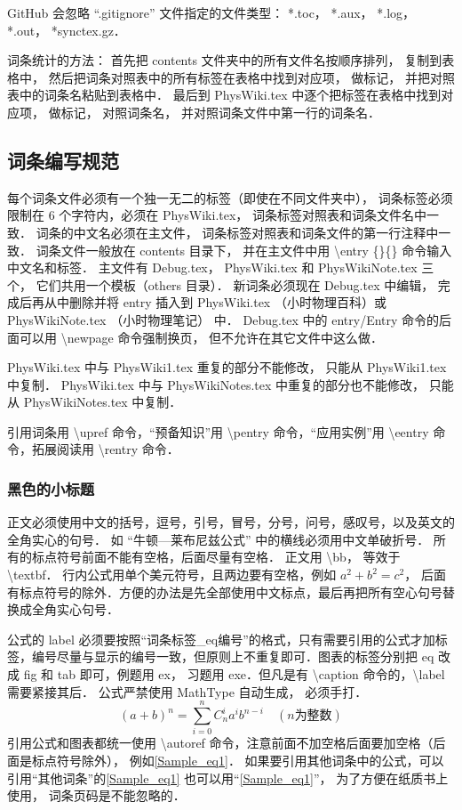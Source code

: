 GitHub 会忽略 “.gitignore” 文件指定的文件类型： *.toc， *.aux， *.log， *.out， *synctex.gz．

词条统计的方法： 首先把 contents 文件夹中的所有文件名按顺序排列， 复制到表格中， 然后把词条对照表中的所有标签在表格中找到对应项， 做标记， 并把对照表中的词条名粘贴到表格中． 最后到 PhysWiki.tex 中逐个把标签在表格中找到对应项， 做标记， 对照词条名， 并对照词条文件中第一行的词条名．

\subsection{词条编写规范}

每个词条文件必须有一个独一无二的标签（即使在不同文件夹中）， 词条标签必须限制在 6 个字符内，必须在 PhysWiki.tex， 词条标签对照表和词条文件名中一致． 词条的中文名必须在主文件， 词条标签对照表和词条文件的第一行注释中一致． 词条文件一般放在 contents 目录下， 并在主文件中用 \textbackslash entry \{\}\{\} 命令输入中文名和标签． 主文件有 Debug.tex， PhysWiki.tex 和 PhysWikiNote.tex 三个， 它们共用一个模板（others 目录）． 新词条必须现在 Debug.tex 中编辑， 完成后再从中删除并将 entry 插入到 PhysWiki.tex （小时物理百科）或 PhysWikiNote.tex （小时物理笔记） 中． Debug.tex 中的 entry/Entry 命令的后面可以用 \textbackslash newpage 命令强制换页， 但不允许在其它文件中这么做．

PhysWiki.tex 中与 PhysWiki1.tex 重复的部分不能修改， 只能从 PhysWiki1.tex 中复制． PhysWiki.tex 中与 PhysWikiNotes.tex 中重复的部分也不能修改， 只能从 PhysWikiNotes.tex 中复制．

引用词条用 \textbackslash upref 命令，“预备知识”用 \textbackslash pentry 命令，“应用实例”用 \textbackslash eentry 命令，拓展阅读用 \textbackslash rentry 命令．

\subsubsection{黑色的小标题}

正文必须使用中文的括号，逗号，引号，冒号，分号，问号，感叹号，以及英文的全角实心的句号． 如 “牛顿—莱布尼兹公式” 中的横线必须用中文单破折号． 所有的标点符号前面不能有空格，后面尽量有空格． 正文用 \textbackslash bb， 等效于 \textbackslash textbf． 行内公式用单个美元符号，且两边要有空格，例如 $a^2+b^2=c^2$， 后面有标点符号的除外．方便的办法是先全部使用中文标点，最后再把所有空心句号替换成全角实心句号．

公式的 label 必须要按照“词条标签\_eq编号”的格式，只有需要引用的公式才加标签，编号尽量与显示的编号一致，但原则上不重复即可．图表的标签分别把 eq 改成 fig 和 tab 即可，例题用 ex， 习题用 exe．但凡是有 \textbackslash caption 命令的，\textbackslash label 需要紧接其后． 公式严禁使用 MathType 自动生成， 必须手打．
\begin{equation}\label{Sample_eq1}
(a+b)^n = \sum_{i=0}^n C_n^i a^i b^{n-i} \quad (n\text{为整数})
\end{equation}
引用公式和图表都统一使用 \textbackslash autoref 命令，注意前面不加空格后面要加空格（后面是标点符号除外）， 例如\autoref{Sample_eq1}． 如果要引用其他词条中的公式，可以引用“其他词条”的\autoref{Sample_eq1} 也可以用“\autoref{Sample_eq1}”， 为了方便在纸质书上使用， 词条页码是不能忽略的．

